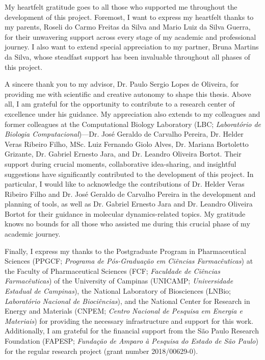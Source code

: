 \documentclass[Ingles]{phdthesis}
\begin{document}

My heartfelt gratitude goes to all those who supported me throughout the development of this project. Foremost, I want to express my heartfelt thanks to my parents, Roseli do Carmo Freitas da Silva and Mario Luiz da Silva Guerra, for their unwavering support across every stage of my academic and professional journey. I also want to extend special appreciation to my partner, Bruna Martins da Silva, whose steadfast support has been invaluable throughout all phases of this project.

A sincere thank you to my advisor, Dr. Paulo Sergio Lopes de Oliveira, for providing me with scientific and creative autonomy to shape this thesis. Above all, I am grateful for the opportunity to contribute to a research center of excellence under his guidance. My appreciation also extends to my colleagues and former colleagues at the Computational Biology Laboratory (LBC; \textit{Laboratório de Biologia Computacional})---Dr. José Geraldo de Carvalho Pereira, Dr. Helder Veras Ribeiro Filho, MSc. Luiz Fernando Giolo Alves, Dr. Mariana Bortoletto Grizante, Dr. Gabriel Ernesto Jara, and Dr. Leandro Oliveira Bortot. Their support during crucial moments, collaborative idea-sharing, and insightful suggestions have significantly contributed to the development of this project. In particular, I would like to acknowledge the contributions of Dr. Helder Veras Ribeiro Filho and Dr. José Geraldo de Carvalho Pereira in the development and planning of tools, as well as Dr. Gabriel Ernesto Jara and Dr. Leandro Oliveira Bortot for their guidance in molecular dynamics-related topics. My gratitude knows no bounds for all those who assisted me during this crucial phase of my academic journey.

Finally, I express my thanks to the Postgraduate Program in Pharmaceutical Sciences (PPGCF; \textit{Programa de Pós-Graduação em Ciências Farmacêuticas}) at the Faculty of Pharmaceutical Sciences (FCF; \textit{Faculdade de Ciências Farmacêuticas}) of the University of Campinas (UNICAMP; \textit{Universidade Estadual de Campinas}), the National Laboratory of Biosciences (LNBio; \textit{Laboratório Nacional de Biociências}), and the National Center for Research in Energy and Materials (CNPEM; \textit{Centro Nacional de Pesquisa em Energia e Materiais}) for providing the necessary infrastructure and support for this work. Additionally, I am grateful for the financial support from the São Paulo Research Foundation (FAPESP; \textit{Fundação de Amparo à Pesquisa do Estado de São Paulo}) for the regular research project (grant number 2018/00629-0).
\end{document}
